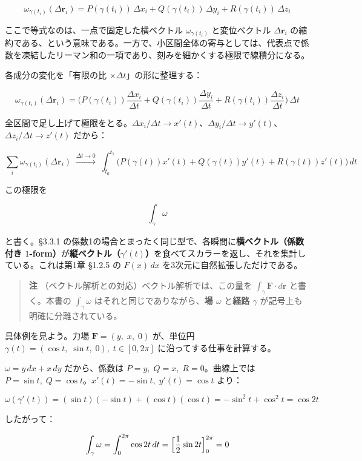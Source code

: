 \documentclass[a4paper,12pt,openany]{book}
\begin{document}
\[\omega_{\gamma(t_i)}(\Delta\mathbf{r}_i) = P(\gamma(t_i))\,\Delta x_i + Q(\gamma(t_i))\,\Delta y_i + R(\gamma(t_i))\,\Delta z_i\]

ここで等式なのは、一点で固定した横ベクトル \(\omega_{\gamma(t_i)}\)
と変位ベクトル \(\Delta\mathbf{r}_i\)
の縮約である、という意味である。一方で、小区間全体の寄与としては、代表点で係数を凍結したリーマン和の一項であり、刻みを細かくする極限で線積分になる。

各成分の変化を「有限の比 \(\times \Delta t\)」の形に整理する：

\[\omega_{\gamma(t_i)}(\Delta\mathbf{r}_i) = \bigl(P(\gamma(t_i))\frac{\Delta x_i}{\Delta t} + Q(\gamma(t_i))\frac{\Delta y_i}{\Delta t} + R(\gamma(t_i))\frac{\Delta z_i}{\Delta t}\bigr)\,\Delta t\]

全区間で足し上げて極限をとる。\(\Delta x_i/\Delta t \to x'(t)\)、\(\Delta y_i/\Delta t \to y'(t)\)、\(\Delta z_i/\Delta t \to z'(t)\)
だから：

\[\sum_i \omega_{\gamma(t_i)}(\Delta\mathbf{r}_i) \;\xrightarrow{\Delta t \to 0}\; \int_{t_0}^{t_1} \bigl(P(\gamma(t))x'(t)+Q(\gamma(t))y'(t)+R(\gamma(t))z'(t)\bigr)\,dt\]

この極限を

\[\int_\gamma \omega\]

と書く。§3.3.1
の係数1の場合とまったく同じ型で、各瞬間に\textbf{横ベクトル（係数付き $1$-form）}が\textbf{縦ベクトル（$\gamma'(t)$）}を食べてスカラーを返し、それを集計している。これは第1章
§1.2.5 の \(F(x)\,dx\) を3次元に自然拡張しただけである。

\begin{quote}
\textbf{注} （ベクトル解析との対応）ベクトル解析では、この量を
\(\int_\gamma \mathbf{F}\cdot d\mathbf{r}\) と書く。本書の
\(\int_\gamma \omega\) はそれと同じでありながら、\textbf{場 $\omega$}
と\textbf{経路 $\gamma$} が記号上も明確に分離されている。
\end{quote}

具体例を見よう。力場 \(\mathbf{F} = (y,\; x,\; 0)\) が、単位円
\(\gamma(t) = (\cos t,\; \sin t,\; 0),\; t \in [0, 2\pi]\)
に沿ってする仕事を計算する。

\(\omega = y\,dx + x\,dy\) だから、係数は
\(P=y,\;Q=x,\;R=0\)。曲線上では
\(P=\sin t,\;Q=\cos t\)。\(x'(t)=-\sin t,\; y'(t)=\cos t\) より：

\[\omega(\gamma'(t)) = (\sin t)(-\sin t) + (\cos t)(\cos t) = -\sin^2\!t + \cos^2\!t = \cos 2t\]

したがって：

\[\int_\gamma \omega = \int_0^{2\pi} \cos 2t\,dt = \Bigl[\frac{1}{2}\sin 2t\Bigr]_0^{2\pi} = 0\]
\end{document}
